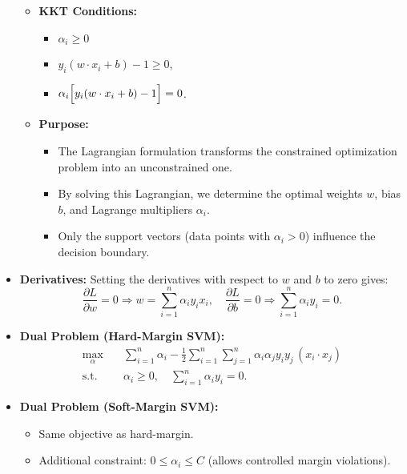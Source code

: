 \documentclass[10pt]{article}
\begin{document}
\begin{itemize}
\begin{itemize}
            \item \textbf{KKT Conditions:} 
                \begin{itemize}
                    \item \(\alpha_i \geq 0\)
                    \item \(y_i (w \cdot x_i + b) - 1 \geq 0\),
                    \item \(\alpha_i \Bigl[y_i (w \cdot x_i + b) - 1\Bigr] = 0\).
                \end{itemize}
                
            \item \textbf{Purpose:} 
                \begin{itemize}
                    \item The Lagrangian formulation transforms the constrained optimization problem into an unconstrained one.
                    \item By solving this Lagrangian, we determine the optimal weights \(w\), bias \(b\), and Lagrange multipliers \(\alpha_i\).
                    \item Only the support vectors (data points with \(\alpha_i > 0\)) influence the decision boundary.
                \end{itemize}
        \end{itemize}
    \item \textbf{Derivatives:} Setting the derivatives with respect to \(w\) and \(b\) to zero gives:
    \[
    \frac{\partial L}{\partial w} = 0 \Rightarrow w = \sum_{i=1}^{n} \alpha_i y_i x_i, \quad \frac{\partial L}{\partial b} = 0 \Rightarrow \sum_{i=1}^{n} \alpha_i y_i = 0.
    \]
    \item \textbf{Dual Problem (Hard-Margin SVM):}
    \[
    \begin{aligned}
    \max_{\alpha} \quad & \sum_{i=1}^{n} \alpha_i - \frac{1}{2}\sum_{i=1}^{n}\sum_{j=1}^{n} \alpha_i \alpha_j y_i y_j \, (x_i \cdot x_j) \\
    \text{s.t.} \quad & \alpha_i \geq 0, \quad \sum_{i=1}^{n} \alpha_i y_i = 0.
    \end{aligned}
    \]
     \item \textbf{Dual Problem (Soft-Margin SVM):}
    \begin{itemize}
        \item Same objective as hard-margin.
        \item Additional constraint: \(0\le \alpha_i \le C\) (allows controlled margin violations).
    \end{itemize}
\end{itemize}
\end{document}

